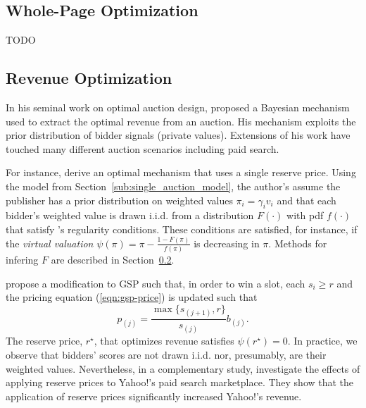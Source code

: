 \documentclass[prodmode,acmtist]{acmsmall} %
\begin{document}


\subsection{Whole-Page Optimization} %
\label{sub:whole_page_optimization}

TODO



\subsection{Revenue Optimization} %
\label{sub:revenue_optimization}

In his seminal work on optimal auction design,  proposed a Bayesian mechanism used to extract the optimal revenue from an auction.
His mechanism exploits the prior distribution of bidder signals (private values).
Extensions of his work have touched many different auction scenarios including paid search. 

For instance,  derive an optimal mechanism that uses a single reserve price.
Using the model from Section~\ref{sub:single_auction_model}, the author's assume the publisher has a prior distribution on weighted values $\pi_i = \gamma_i v_i$ and that each bidder's weighted value is drawn i.i.d. from a distribution $F(\cdot)$ with pdf $f(\cdot)$ that satisfy 's regularity conditions.
These conditions are satisfied, for instance, if the \emph{virtual valuation} $\psi(\pi) = \pi - \frac{1 - F(\pi)}{f(\pi)}$ is decreasing in $\pi$.
Methods for infering $F$ are described in Section~\ref{sub:revenue_optimization}.

 propose a modification to GSP such that, in order to win a slot, each $s_i \ge r$ and the pricing equation (\ref{eqn:gsp-price}) is updated such that
\begin{equation}
p_{(j)} = \frac{\max\{s_{(j+1)},r\}}{s_{(j)}} b_{(j)}.
\label{eqn:gsp-reserve-price}	
\end{equation}
The reserve price, $r^\star$, that optimizes revenue satisfies $\psi(r^\star) = 0$.
In practice, we observe that bidders' scores are not drawn i.i.d. nor, presumably, are their weighted values.
Nevertheless, in a complementary study,  investigate the effects of applying reserve prices to Yahoo!'s paid search marketplace.  
They show that the application of reserve prices significantly increased Yahoo!'s revenue.
\end{document}
